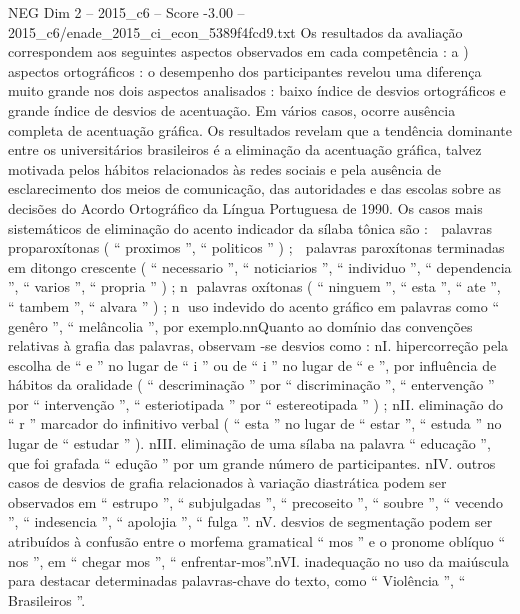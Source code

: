 \begin{textsample}{NEG Dim 2 – 2015\_c6 – Score -3.00 – 2015\_c6/enade\_2015\_ci\_econ\_5389f4fcd9.txt}
Os resultados da avaliação correspondem aos seguintes aspectos observados em cada competência : a ) aspectos ortográficos : o desempenho dos participantes revelou uma diferença muito grande nos dois aspectos analisados : baixo índice de desvios ortográficos e grande índice de desvios de acentuação.
Em vários casos, ocorre ausência completa de acentuação gráfica.
Os resultados revelam que a tendência dominante entre os universitários brasileiros é a eliminação da acentuação gráfica, talvez motivada pelos hábitos relacionados às redes sociais e pela ausência de esclarecimento dos meios de comunicação, das autoridades e das escolas sobre as decisões do Acordo Ortográfico da Língua Portuguesa de 1990.
Os casos mais sistemáticos de eliminação do acento indicador da sílaba tônica são :  palavras proparoxítonas ( “ proximos ”, “ politicos ” ) ;  palavras paroxítonas terminadas em ditongo crescente ( “ necessario ”, “ noticiarios ”, “ individuo ”, “ dependencia ”, “ varios ”, “ propria ” ) ; n palavras oxítonas ( “ ninguem ”, “ esta ”, “ ate ”, “ tambem ”, “ alvara ” ) ; n uso indevido do acento gráfico em palavras como “ genêro ”, “ melâncolia ”, por exemplo.nnQuanto ao domínio das convenções relativas à grafia das palavras, observam -se desvios como : nI. hipercorreção pela escolha de “ e ” no lugar de “ i ” ou de “ i ” no lugar de “ e ”, por influência de hábitos da oralidade ( “ descriminação ” por “ discriminação ”, “ entervenção ” por “ intervenção ”, “ esteriotipada ” por “ estereotipada ” ) ; nII. eliminação do “ r ” marcador do infinitivo verbal ( “ esta ” no lugar de “ estar ”, “ estuda ” no lugar de “ estudar ” ). nIII. eliminação de uma sílaba na palavra “ educação ”, que foi grafada “ edução ” por um grande número de participantes. nIV. outros casos de desvios de grafia relacionados à variação diastrática podem ser observados em “ estrupo ”, “ subjulgadas ”, “ precoseito ”, “ soubre ”, “ vecendo ”, “ indesencia ”, “ apolojia ”, “ fulga ”. nV. desvios de segmentação podem ser atribuídos à confusão entre o morfema gramatical “ mos ” e o pronome oblíquo “ nos ”, em “ chegar mos ”, “ enfrentar-mos”.nVI. inadequação no uso da maiúscula para destacar determinadas palavras-chave do texto, como “ Violência ”, “ Brasileiros ”.

\end{textsample}
